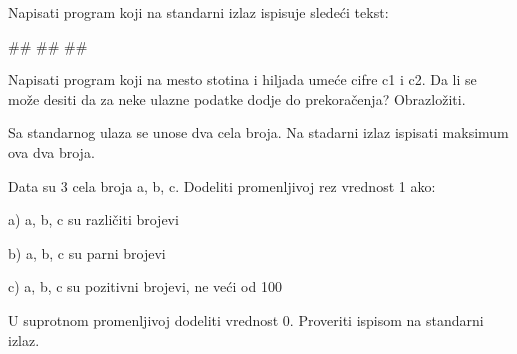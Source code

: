 \begin{Exercise}[label=p1_15]
Napisati program koji na standarni izlaz ispisuje sledeći tekst: \\
\begin{miditest}
\begin{upotreba}{1}
#\naslovInt#
##
##
\end{upotreba}
\end{miditest}
\end{Exercise}
\begin{Answer}[ref=p1_15]
\end{Answer}

\begin{Exercise}[label=p1_16]
Napisati program koji na mesto stotina i hiljada umeće cifre c1 i c2. 
Da li se može desiti da za neke ulazne podatke dodje do prekoračenja?
Obrazložiti. \\
\end{Exercise}
\begin{Answer}[ref=p1_16]
\end{Answer}

\begin{Exercise}[label=p1_17]
Sa standarnog ulaza se unose dva cela broja. Na stadarni izlaz ispisati 
maksimum ova dva broja. \\
\end{Exercise}
\begin{Answer}[ref=p1_17]
\end{Answer}

\begin{Exercise}[label=p1_18]
Data su 3 cela broja a, b, c. Dodeliti promenljivoj rez vrednost 1
ako:
\begin{description}
\item{a)} a, b, c su različiti brojevi
\item{b)} a, b, c su parni brojevi
\item{c)} a, b, c su pozitivni brojevi, ne veći od 100
\end{description}
U suprotnom promenljivoj dodeliti vrednost 0. Proveriti ispisom na
standarni izlaz. \\
\end{Exercise}
\begin{Answer}[ref=p1_18]
\end{Answer}

